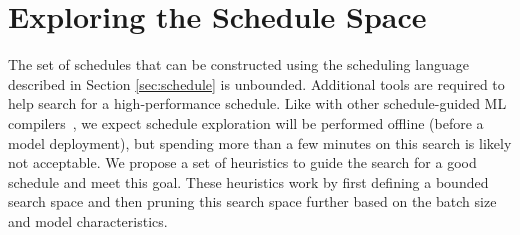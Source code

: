 \section{Exploring the Schedule Space}
\label{sec:exploring}

The set of schedules that can be constructed using the scheduling language described in 
Section \ref{sec:schedule} is unbounded.
Additional tools are required to help search for a high-performance schedule.
Like with other schedule-guided ML compilers~\cite{TVM},
we expect schedule exploration will be performed offline (before a model deployment),
but spending more than a few minutes on this search is likely not acceptable.
We propose a set of heuristics to guide the search for a good schedule 
and meet this goal. These heuristics work by first defining a 
bounded search space and then pruning this search space further
based on the batch size and model characteristics.

